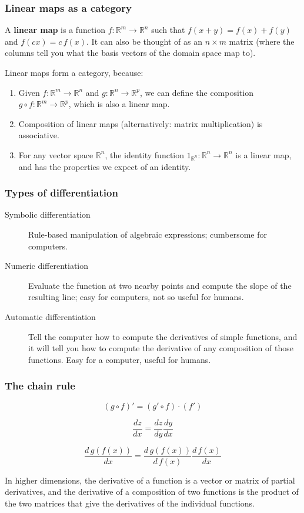 \documentclass[10pt]{beamer}
\theoremstyle{definition}
\theoremstyle{remark}
\numberwithin{equation}{section}
\begin{document}
\begin{frame}[fragile]{}
  \frametitle{Linear maps as a category}

  A \textbf{linear map} is a function $f\colon \mathbb{R}^m \rightarrow \mathbb{R}^n$
  such that $f(x + y) = f(x) + f(y)$ and $f(cx) = c\,f(x)$.
  It can also be thought of as an $n \times m$ matrix (where the columns tell you
  what the basis vectors of the domain space map to).

  Linear maps form a category, because:
  \begin{enumerate}
  \item Given $f\colon \mathbb{R}^m \rightarrow \mathbb{R}^n$ and $g\colon \mathbb{R}^n \rightarrow
    \mathbb{R}^p$, we can define the composition $g \circ f \colon \mathbb{R}^m \rightarrow
    \mathbb{R}^p$, which is also a linear map.
  \item Composition of linear maps (alternatively: matrix multiplication) is
    associative.
  \item For any vector space $\mathbb{R}^n$, the identity function
    $1_{\mathbb{R}^n}\colon \mathbb{R}^n \rightarrow \mathbb{R}^n$ is a linear map, and
    has the properties we expect of an identity.
  \end{enumerate}
\end{frame}

\begin{frame}[fragile]
  \frametitle{Types of differentiation}

  \begin{description}
  \item[Symbolic differentiation] Rule-based manipulation of algebraic
    expressions; cumbersome for computers.
  \item[Numeric differentiation] Evaluate the function at two nearby points and
    compute the slope of the resulting line; easy for computers, not so useful
    for humans.
  \item[Automatic differentiation] Tell the computer how to compute the
    derivatives of simple functions, and it will tell you how to compute the
    derivative of any composition of those functions. Easy for a computer,
    useful for humans.
  \end{description}
\end{frame}

\begin{frame}[fragile]
  \frametitle{The chain rule}

  \[(g \circ f)' = (g' \circ f) \cdot (f')\]

  \[\frac{dz}{dx} = \frac{dz}{dy} \frac{dy}{dx}\]

  \[\frac{d\,g(f(x))}{dx} = \frac{d\,g(f(x))}{d\,f(x)} \frac{d\,f(x)}{dx}\]

  In higher dimensions, the derivative of a function is a vector or matrix of
  partial derivatives,
  and the derivative of a composition of two functions is the product of the two
  matrices that give the derivatives of the individual functions.

\end{frame}
\end{document}
